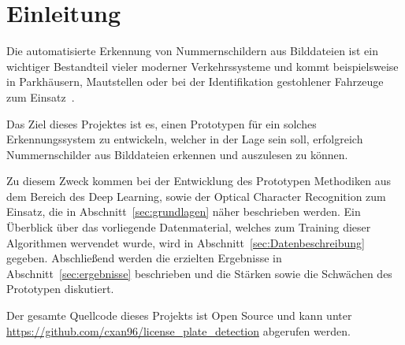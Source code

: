 \section{Einleitung}

Die automatisierte Erkennung von Nummernschildern aus Bilddateien
ist ein wichtiger Bestandteil vieler moderner Verkehrssysteme
und kommt beispielsweise in Parkh\"ausern, Mautstellen
oder bei der Identifikation gestohlener Fahrzeuge zum
Einsatz~\cite{silva2018a}.

Das Ziel dieses Projektes ist es, einen Prototypen f\"ur ein solches
Erkennungssystem zu entwickeln, welcher in der
Lage sein soll, erfolgreich Nummernschilder aus Bilddateien erkennen
und auszulesen zu k\"onnen.

Zu diesem Zweck kommen bei der Entwicklung des Prototypen Methodiken aus dem
Bereich des Deep Learning, sowie der Optical Character Recognition
zum Einsatz, die in Abschnitt~\ref{sec:grundlagen} n\"aher beschrieben
werden.
Ein \"Uberblick \"uber das vorliegende Datenmaterial, welches
zum Training dieser Algorithmen wervendet wurde, wird in
Abschnitt~\ref{sec:Datenbeschreibung} gegeben.
Abschlie{\ss}end werden die erzielten Ergebnisse in
Abschnitt~\ref{sec:ergebnisse} beschrieben und die St\"arken
sowie die Schw\"achen des Prototypen diskutiert.

Der gesamte Quellcode dieses Projekts ist Open Source und kann
unter \url{https://github.com/cxan96/license_plate_detection}
abgerufen werden.
